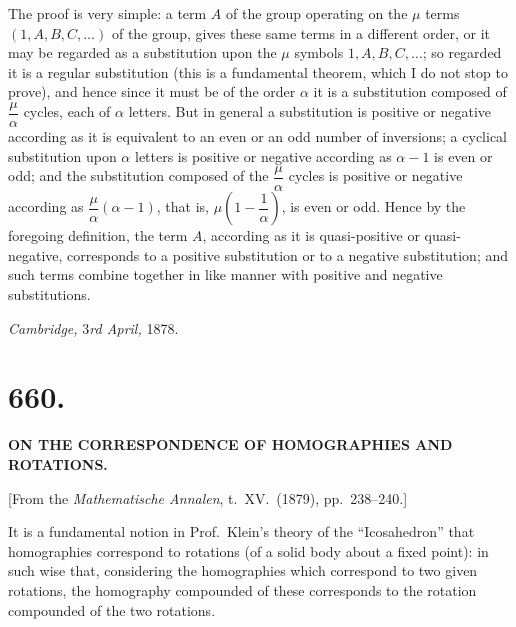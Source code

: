 \documentclass[11pt,a4paper]{article}
\begin{document}
The proof is very simple: a term $A$ of the group operating on the $\mu$ terms $(1, A, B, C, \ldots)$ of the group, gives these same terms in a different order, or it may be regarded as a substitution upon the $\mu$ symbols $1, A, B, C, \ldots$; so regarded it is a regular substitution (this is a fundamental theorem, which I do not stop to prove), and hence since it must be of the order $\alpha$ it is a substitution composed of $\dfrac{\mu}{\alpha}$ cycles, each of $\alpha$ letters. But in general a substitution is positive or negative according as it is equivalent to an even or an odd number of inversions; a cyclical substitution upon $\alpha$ letters is positive or negative according as $\alpha - 1$ is even or odd; and the substitution composed of the $\dfrac{\mu}{\alpha}$ cycles is positive or negative according as $\dfrac{\mu}{\alpha}(\alpha - 1)$, that is, $\mu\!\left(1 - \dfrac{1}{\alpha}\right)$, is even or odd. Hence by the foregoing definition, the term $A$, according as it is quasi-positive or quasi-negative, corresponds to a positive substitution or to a negative substitution; and such terms combine together in like manner with positive and negative substitutions.

\medskip

\hfill \emph{Cambridge,} 3\emph{rd April,} 1878.

\newpage


\section*{660.}

\begin{center}
\textbf{ON THE CORRESPONDENCE OF HOMOGRAPHIES AND ROTATIONS.}
\end{center}

\medskip

\begin{center}
[From the \emph{Mathematische Annalen}, t.~XV.\ (1879), pp.~238--240.]
\end{center}

\medskip

\noindent It is a fundamental notion in Prof.\ Klein's theory of the ``Icosahedron'' that homographies correspond to rotations (of a solid body about a fixed point): in such wise that, considering the homographies which correspond to two given rotations, the homography compounded of these corresponds to the rotation compounded of the two rotations.
\end{document}
